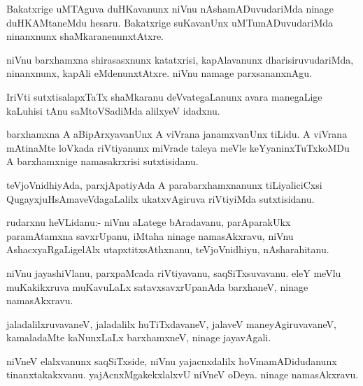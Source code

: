 \documentclass{article}
\begin{document}
\begin{mn}
Bakatxrige uMTAguva duHKavanunx niVnu nAshamADuvudariMda ninage
duHKAMtaneMdu hesaru. Bakatxrige suKavanUnx uMTumADuvudariMda
ninanxnunx shaMkaranenunxtAtxre.
\end{mn}

\begin{mn}
niVnu barxhamxna shirasasxnunx katatxrisi, kapAlavanunx
dharisiruvudariMda, ninanxnunx, kapAli eMdenunxtAtxre. niVnu namage parxsananxnAgu.
\end{mn}

\begin{mn}
IriVti sutxtisalapxTaTx shaMkaranu deVvategaLanunx avara manegaLige
kaLuhisi tAnu saMtoVSadiMda alilxyeV idadxnu.
\end{mn}

\begin{mn}
barxhamxna A aBipArxyavanUnx A viVrana janamxvanUnx tiLidu. A viVrana
mAtinaMte loVkada riVtiyanunx miVrade taleya meVle keYyaninxTuTxkoMDu
A barxhamxnige namasakrxrisi sutxtisidanu.
\end{mn}

\begin{mn}%
teVjoVnidhiyAda, parxjApatiyAda A parabarxhamxnanunx tiLiyaliciCxsi
QugayxjuHsAmaveVdagaLalilx ukatxvAgiruva riVtiyiMda sutxtisidanu.
\end{mn}

\begin{mn}
rudarxnu heVLidanu:- niVnu aLatege bAradavanu, parAparakUkx
paramAtamxna savxrUpanu, iMtaha ninage namasAkxravu, niVnu
AshacxyaRgaLigelAlx utapxtitxsAthxnanu, teVjoVnidhiyu, nAsharahitanu.
\end{mn}

\begin{mn}
niVnu jayashiVlanu, parxpaMcada riVtiyavanu, saqSiTxsuvavanu. eleY
meVlu muKakikxruva muKavuLaLx satavxsavxrUpanAda barxhaneV, ninage namasAkxravu.
\end{mn}

\begin{mn}
jaladalilxruvavaneV, jaladalilx huTiTxdavaneV, jalaveV
maneyAgiruvavaneV, kamaladaMte kaNunxLaLx barxhamxneV, ninage jayavAgali.
\end{mn}

\begin{mn}
niVneV elalxvanunx saqSiTxside, niVnu yajacnxdalilx hoVmamADidudanunx
tinanxtakakxvanu. yajAcnxMgakekxlalxvU niVneV oDeya. ninage namasAkxravu.
\end{mn}
\end{document}

